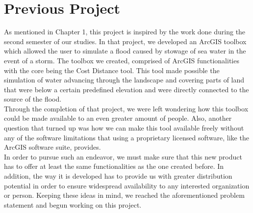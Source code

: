 \section{Previous Project}
As mentioned in Chapter 1, this project is inspired by the work done during the second semester of our studies. In that project, we developed an ArcGIS toolbox which allowed the user to simulate a flood caused by stowage of sea water in the event of a storm. The toolbox we created, comprised of ArcGIS functionalities with the core being the Cost Distance tool. This tool made possible the simulation of water advancing through the landscape and covering parts of land that were below a certain predefined elevation and were directly connected to the source of the flood. \\
Through the completion of that project, we were left wondering how this toolbox could be made available to an even greater amount of people. Also, another question that turned up was how we can make this tool available freely without any of the software limitations that using a proprietary licensed software, like the ArcGIS software suite, provides. \\
In order to pursue such an endeavor, we must make sure that this new product has to offer at least the same functionalities as the one created before. In addition, the way it is developed has to provide us with greater distribution potential in order to ensure widespread availability to any interested organization or person. Keeping these ideas in mind, we reached the aforementioned problem statement and begun working on this project.

